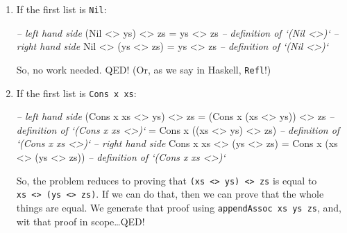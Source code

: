 \documentclass[]{article}
\newenvironment{Shaded}{}{}
\newcommand{\DataTypeTok}[1]{\textcolor[rgb]{0.56,0.13,0.00}{{#1}}}
\newcommand{\CommentTok}[1]{\textcolor[rgb]{0.38,0.63,0.69}{\textit{{#1}}}}
\newcommand{\FunctionTok}[1]{\textcolor[rgb]{0.02,0.16,0.49}{{#1}}}
\newcommand{\NormalTok}[1]{{#1}}
\begin{document}
\begin{enumerate}
\def\labelenumi{\arabic{enumi}.}
\item
  If the first list is \texttt{Nil}:

\begin{Shaded}
\begin{Highlighting}[]
\CommentTok{-- left hand side}
\NormalTok{(}\DataTypeTok{Nil} \FunctionTok{<>} \NormalTok{ys) }\FunctionTok{<>} \NormalTok{zs}
  \FunctionTok{=} \NormalTok{ys }\FunctionTok{<>} \NormalTok{zs        }\CommentTok{-- definition of `(Nil <>)`}
\CommentTok{-- right hand side}
\DataTypeTok{Nil} \FunctionTok{<>} \NormalTok{(ys }\FunctionTok{<>} \NormalTok{zs)}
  \FunctionTok{=} \NormalTok{ys }\FunctionTok{<>} \NormalTok{zs        }\CommentTok{-- definition of `(Nil <>)`}
\end{Highlighting}
\end{Shaded}

  So, no work needed. QED! (Or, as we say in Haskell, \texttt{Refl}!)
\item
  If the first list is \texttt{Cons\ x\ xs}:

\begin{Shaded}
\begin{Highlighting}[]
\CommentTok{-- left hand side}
\NormalTok{(}\DataTypeTok{Cons} \NormalTok{x xs }\FunctionTok{<>} \NormalTok{ys) }\FunctionTok{<>} \NormalTok{zs}
  \FunctionTok{=} \NormalTok{(}\DataTypeTok{Cons} \NormalTok{x (xs }\FunctionTok{<>} \NormalTok{ys)) }\FunctionTok{<>} \NormalTok{zs   }\CommentTok{-- definition of `(Cons x xs <>)`}
  \FunctionTok{=} \DataTypeTok{Cons} \NormalTok{x ((xs }\FunctionTok{<>} \NormalTok{ys) }\FunctionTok{<>} \NormalTok{zs)   }\CommentTok{-- definition of `(Cons x xs <>)`}
\CommentTok{-- right hand side}
\DataTypeTok{Cons} \NormalTok{x xs }\FunctionTok{<>} \NormalTok{(ys }\FunctionTok{<>} \NormalTok{zs)}
  \FunctionTok{=} \DataTypeTok{Cons} \NormalTok{x (xs }\FunctionTok{<>} \NormalTok{(ys }\FunctionTok{<>} \NormalTok{zs))   }\CommentTok{-- definition of `(Cons x xs <>)`}
\end{Highlighting}
\end{Shaded}

  So, the problem reduces to proving that
  \texttt{(xs\ \textless{}\textgreater{}\ ys)\ \textless{}\textgreater{}\ zs} is
  equal to
  \texttt{xs\ \textless{}\textgreater{}\ (ys\ \textless{}\textgreater{}\ zs)}.
  If we can do that, then we can prove that the whole things are equal. We
  generate that proof using \texttt{appendAssoc\ xs\ ys\ zs}, and, wit that
  proof in scope\ldots{}QED!
\end{enumerate}
\end{document}
